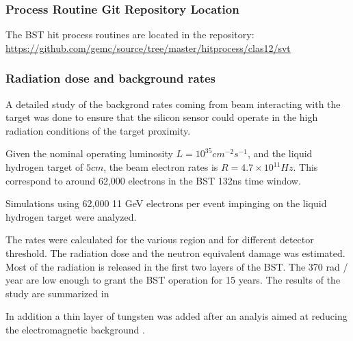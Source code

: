 \subsubsection{Process Routine Git Repository Location}

The BST hit process routines are located in the repository: \url{https://github.com/gemc/source/tree/master/hitprocess/clas12/svt}

\subsubsection{Radiation dose and background rates}
A detailed study of the backgrond rates coming from beam interacting with the target was done to ensure that the silicon sensor
could operate in the high radiation conditions of the target proximity.

Given the nominal operating luminosity $L=10^{35} cm^{-2}s^{-1}$, and the liquid hydrogen target of $5 cm$, the beam electron rates
is $R=4.7 \times 10^{11} Hz$. This correspond to around 62,000 electrons in the BST 132ns time window.

Simulations using 62,000 11 GeV electrons per event impinging on the liquid hydrogen target were analyzed.


The rates were calculated for the various region and for different detector threshold.
The radiation dose and the neutron equivalent damage was estimated. Most of the radiation
is released in the first two layers of the BST.
The 370 rad / year are low enough to grant the BST operation for 15 years. The results of the study
are summarized in 

In addition a thin layer of tungsten was added after an analyis aimed at reducing the electromagnetic
background \cite{bstDose}.

